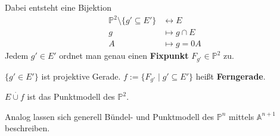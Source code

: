 \documentclass[parskip,a4paper,twoside,DIV15,BCOR12mm]{scrbook}
\begin{document}
\begin{example}
\begin{enumerate}
Dabei entsteht eine Bijektion
\begin{align*}
\mathbb{P}^{2}\setminus\{g'\subseteq E'\}&\longleftrightarrow E\\
g&\mapsto g\cap E\\
A&\mapsto g=0A
\end{align*}
Jedem \(g'\in E'\) ordnet man genau einen \textbf{Fixpunkt} 
    \(F_{g'}\in\mathbb{P}^{2}\) zu.

\(\{g'\in E'\}\) ist projektive Gerade. \(f:=\{F_{g'}\mid g'\subseteq E'\}\)
heißt \textbf{Ferngerade}.

\(E\overset{\cdot}{\cup}f\) ist das Punktmodell des \(\mathbb{P}^{2}\).


Analog lassen sich generell Bündel- und Punktmodell des \(\mathbb{P}^{n}\)
mittels \(\mathbb{A}^{n+1}\) beschreiben.
\end{enumerate}
\end{example}

\renewcommand{\indexname}{Stichwortverzeichnis}
\printindex
\end{document}
